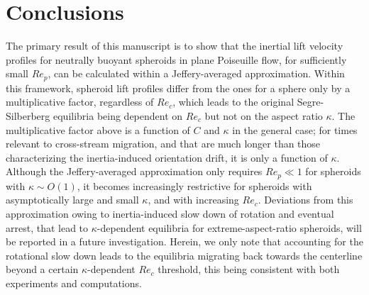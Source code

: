 \documentclass{jfm}
\begin{document}

\section{Conclusions} \label{sec:Ch3conclusion}

The primary result of this manuscript is to show that the inertial lift velocity profiles for neutrally buoyant spheroids in plane Poiseuille flow, for sufficiently small $Re_p$, can be calculated within a Jeffery-averaged approximation. Within this framework, spheroid lift profiles differ from the ones for a sphere only by a multiplicative factor, regardless of $Re_c$, which leads to the original  Segre-Silberberg equilibria being dependent on $Re_c$ but not on the aspect ratio $\kappa$. The multiplicative factor above is a function of $C$ and $\kappa$ in the general case; for times relevant to cross-stream migration, and that are much longer than those characterizing the inertia-induced orientation drift, it is only a function of $\kappa$. Although the Jeffery-averaged approximation only requires $Re_p \ll 1$ for spheroids with $\kappa \sim O(1)$, it becomes increasingly restrictive for spheroids with asymptotically large and small $\kappa$, and with increasing $Re_c$. Deviations from this approximation owing to inertia-induced slow down of rotation and eventual arrest, that lead to $\kappa$-dependent equilibria for extreme-aspect-ratio spheroids, will be reported in a future investigation. Herein, we only note that accounting for the rotational slow down leads to the equilibria migrating back towards the centerline beyond a  certain $\kappa$-dependent $Re_c$ threshold, this being consistent with both experiments\citep{masaeli2012} and computations\citep{chen2012}.
    
\end{document}
